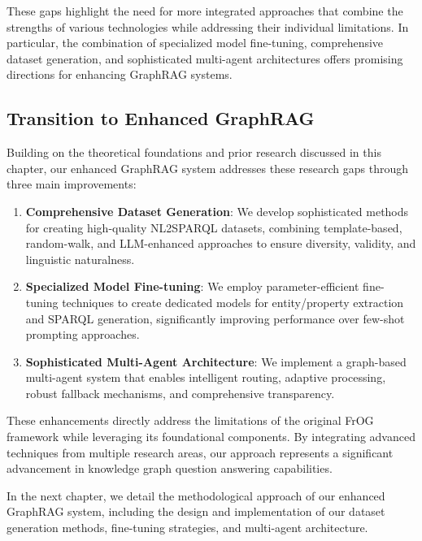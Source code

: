 These gaps highlight the need for more integrated approaches that combine the strengths of various technologies while addressing their individual limitations. In particular, the combination of specialized model fine-tuning, comprehensive dataset generation, and sophisticated multi-agent architectures offers promising directions for enhancing GraphRAG systems.

\subsection{Transition to Enhanced GraphRAG}
Building on the theoretical foundations and prior research discussed in this chapter, our enhanced GraphRAG system addresses these research gaps through three main improvements:

\begin{enumerate}
    \item \textbf{Comprehensive Dataset Generation}: We develop sophisticated methods for creating high-quality NL2SPARQL datasets, combining template-based, random-walk, and LLM-enhanced approaches to ensure diversity, validity, and linguistic naturalness.
    
    \item \textbf{Specialized Model Fine-tuning}: We employ parameter-efficient fine-tuning techniques to create dedicated models for entity/property extraction and SPARQL generation, significantly improving performance over few-shot prompting approaches.
    
    \item \textbf{Sophisticated Multi-Agent Architecture}: We implement a graph-based multi-agent system that enables intelligent routing, adaptive processing, robust fallback mechanisms, and comprehensive transparency.
\end{enumerate}

These enhancements directly address the limitations of the original FrOG framework while leveraging its foundational components. By integrating advanced techniques from multiple research areas, our approach represents a significant advancement in knowledge graph question answering capabilities.

In the next chapter, we detail the methodological approach of our enhanced GraphRAG system, including the design and implementation of our dataset generation methods, fine-tuning strategies, and multi-agent architecture.